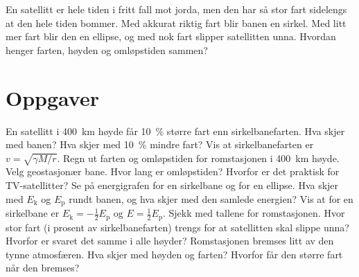 \documentclass[11pt]{article}
\begin{document}

En satellitt er hele tiden i fritt fall mot jorda, men den har så stor fart sidelengs at den hele tiden bommer. Med akkurat riktig fart blir banen en sirkel. Med litt mer fart blir den en ellipse, og med nok fart slipper satellitten unna. Hvordan henger farten, høyden og omløpstiden sammen?

\section*{Oppgaver}

\begin{oppgaveliste}
\oppgave {}En satellitt i 400~km høyde får 10~\% større fart enn sirkelbanefarten. Hva skjer med banen? Hva skjer med 10~\% mindre fart?
\svar
\oppgave {}Vis at sirkelbanefarten er $v = \sqrt{γM/r}$. Regn ut farten og omløpstiden for romstasjonen i 400~km høyde.
\svar
\oppgave {}Velg geostasjonær bane. Hvor lang er omløpstiden? Hvorfor er det praktisk for TV-satellitter?
\svar
\oppgave {}Se på energigrafen for en sirkelbane og for en ellipse. Hva skjer med $E_{\mathrm{k}}$ og $E_{\mathrm{p}}$ rundt banen, og hva skjer med den samlede energien?
\svar
\oppgave {}Vis at for en sirkelbane er $E_{\mathrm{k}} = -\tfrac{1}{2}E_{\mathrm{p}}$ og $E = \tfrac{1}{2}E_{\mathrm{p}}$. Sjekk med tallene for romstasjonen.
\svar
\oppgave {}Hvor stor fart (i prosent av sirkelbanefarten) trengs for at satellitten skal slippe unna? Hvorfor er svaret det samme i alle høyder?
\svar
\oppgave {}Romstasjonen bremses litt av den tynne atmosfæren. Hva skjer med høyden og farten? Hvorfor får den større fart når den bremses?
\svar
\end{oppgaveliste}
\end{document}

